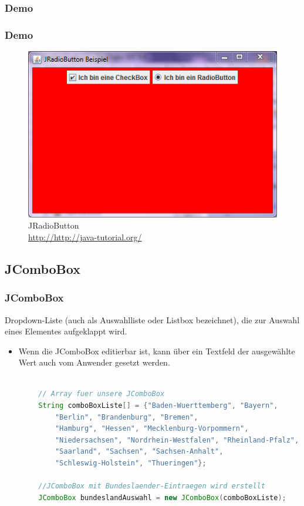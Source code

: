 \documentclass[xcolor=dvipsnames]{beamer}
\begin{document}
\subsubsection{Demo}
\begin{frame}
  \frametitle{Demo}
	\begin{figure}
		\includegraphics[scale=0.8]{images/jradiobutton.PNG}
		\caption{JRadioButton \\ \tiny{\textcolor{gray}{\url{http://http://java-tutorial.org/}}}}
		\end{figure}
\end{frame}


\subsection{JComboBox}
\begin{frame}  %
  \frametitle{JComboBox} %
  \begin{block}{Dropdown-Liste (auch als Auswahlliste oder Listbox bezeichnet), die zur Auswahl eines Elementes aufgeklappt wird. }
	  \begin{itemize}
		\item Wenn die JComboBox editierbar ist, kann über ein Textfeld der ausgewählte Wert auch vom Anwender gesetzt werden.
	  \end{itemize}
  \end{block}

\begin{lstlisting}[language=java,basicstyle=\scriptsize\ttfamily]

    	// Array fuer unsere JComboBox
        String comboBoxListe[] = {"Baden-Wuerttemberg", "Bayern",
            "Berlin", "Brandenburg", "Bremen",
            "Hamburg", "Hessen", "Mecklenburg-Vorpommern",
            "Niedersachsen", "Nordrhein-Westfalen", "Rheinland-Pfalz",
            "Saarland", "Sachsen", "Sachsen-Anhalt",
            "Schleswig-Holstein", "Thueringen"};
 
        //JComboBox mit Bundeslaender-Eintraegen wird erstellt
        JComboBox bundeslandAuswahl = new JComboBox(comboBoxListe);

\end{lstlisting}

\end{frame}
\end{document}
